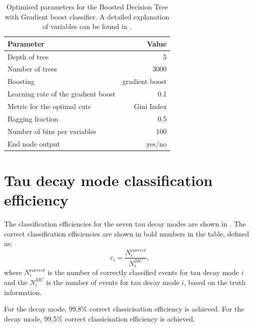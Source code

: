 


\begin{table}[!htbp]\centering
\begin{tabular}{lr}
\hline \hline
 Parameter &  Value \\
\hline
Depth of tree & 5 \\
Number of trees & 3000 \\
Boosting & gradient boost \\
Learning rate of the gradient boost & 0.1 \\
Metric for the optimal cuts & Gini Index \\
Bagging fraction & 0.5 \\
Number of bins per variables & 100 \\
End node output & yes/no \\
\hline \hline
\end{tabular}

\caption
{Optimised parameters for the Boosted Decision Tree with Gradient boost \multiclass classifier. A detailed explanation of variables can be found in .}
\label{tab:tauBDTparameters}
\end{table}


\section{Tau decay mode classification efficiency}
\label{sec:tauClassificationEff}
The classification efficiencies for the seven tau decay modes are shown in . The correct classification efficiencies are shown in bold numbers in the table, defined as:
\begin{equation}
\varepsilon_i = \frac{N^{correct}_i}{N^{MC}_i},
\label{eqn:tauEff}
\end{equation}
where $N^{correct}_i$ is the number of correctly classified events for tau decay mode $i$ and the $N^{MC}_i$ is the number of events for tau decay mode $i$, based on the truth information.

For the \decayElectronShort decay mode,   99.8\%  correct classicisation efficiency is achieved. For the \decayMuonShort decay mode,  99.5\% correct classicisation efficiency is achieved.

